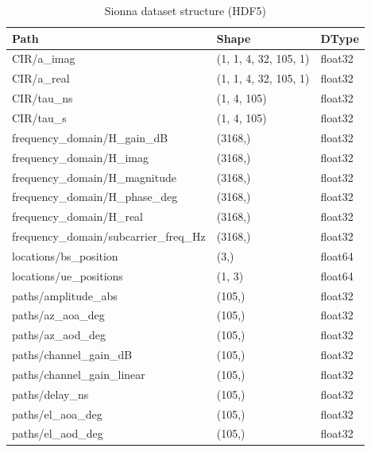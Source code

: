 \begin{table}
\caption{Sionna dataset structure (HDF5)}
\label{tab:sionna_dataset}
\begin{tabular}{lll}
\toprule
Path & Shape & DType \\
\midrule
CIR/a\_imag & (1, 1, 4, 32, 105, 1) & float32 \\
CIR/a\_real & (1, 1, 4, 32, 105, 1) & float32 \\
CIR/tau\_ns & (1, 4, 105) & float32 \\
CIR/tau\_s & (1, 4, 105) & float32 \\
frequency\_domain/H\_gain\_dB & (3168,) & float32 \\
frequency\_domain/H\_imag & (3168,) & float32 \\
frequency\_domain/H\_magnitude & (3168,) & float32 \\
frequency\_domain/H\_phase\_deg & (3168,) & float32 \\
frequency\_domain/H\_real & (3168,) & float32 \\
frequency\_domain/subcarrier\_freq\_Hz & (3168,) & float32 \\
locations/bs\_position & (3,) & float64 \\
locations/ue\_positions & (1, 3) & float64 \\
paths/amplitude\_abs & (105,) & float32 \\
paths/az\_aoa\_deg & (105,) & float32 \\
paths/az\_aod\_deg & (105,) & float32 \\
paths/channel\_gain\_dB & (105,) & float32 \\
paths/channel\_gain\_linear & (105,) & float32 \\
paths/delay\_ns & (105,) & float32 \\
paths/el\_aoa\_deg & (105,) & float32 \\
paths/el\_aod\_deg & (105,) & float32 \\
\bottomrule
\end{tabular}
\end{table}
